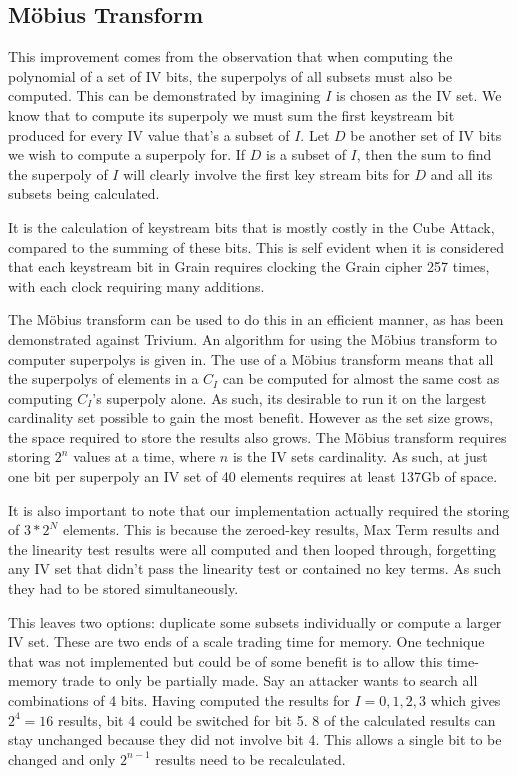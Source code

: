 \documentclass{report}
\let\Oldsubsection\subsection
\renewcommand{\subsection}{\FloatBarrier\Oldsubsection}
\begin{document}
\subsection{M\"{o}bius Transform}
This improvement comes from the observation that when computing the polynomial of a set of IV bits, the superpolys of all subsets must also be computed. This can be demonstrated by imagining $I$ is chosen as the IV set. We know that to compute its superpoly we must sum the first keystream bit produced for every IV value that's a subset of $I$. Let $D$ be another set of IV bits we wish to compute a superpoly for. If $D$ is a subset of $I$, then the sum to find the superpoly of $I$ will clearly involve the first key stream bits for $D$ and all its subsets being calculated.

It is the calculation of keystream bits that is mostly costly in the Cube Attack, compared to the summing of these bits. This is self evident when it is considered that each keystream bit in Grain requires clocking the Grain cipher 257 times, with each clock requiring many additions.

The M\"{o}bius transform can be used to do this in an efficient manner, as has been demonstrated against Trivium\cite{MobiusTransform}. An algorithm for using the M\"{o}bius transform to computer superpolys is given in\cite{MobiusTransform}.
The use of a M\"{o}bius transform means that all the superpolys of elements in a $C_I$ can be computed for almost the same cost as computing $C_I$'s superpoly alone. As such, its desirable to run it on the largest cardinality set possible to gain the most benefit. However as the set size grows, the space required to store the results also grows. The M\"{o}bius transform requires storing $2^n$ values at a time, where $n$ is the IV sets cardinality. As such, at just one bit per superpoly an IV set of 40 elements requires at least 137Gb of space.

It is also important to note that our implementation actually required the storing of $3*2^N$ elements. This is because the zeroed-key results, Max Term results and the linearity test results were all computed and then looped through, forgetting any IV set that didn't pass the linearity test or contained no key terms. As such they had to be stored simultaneously.

This leaves two options: duplicate some subsets individually or compute a larger IV set. These are two ends of a scale trading time for memory. One technique that was not implemented but could be of some benefit is to allow this time-memory trade to only be partially made. Say an attacker wants to search all combinations of 4 bits. Having computed the results for $I={0,1,2,3}$ which gives $2^4=16$ results, bit 4 could be switched for bit 5. 8 of the calculated results can stay unchanged because they did not involve bit 4. This allows a single bit to be changed and only $2^{n-1}$ results need to be recalculated.
\end{document}
